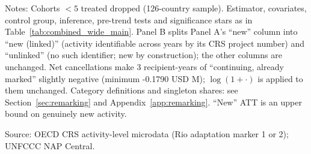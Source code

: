 \begin{table}[H]
{\begin{tabular}{lcccc}
\bottomrule
\end{tabular}
}
\endgroup
\par\vspace{4pt}
\begin{minipage}{\linewidth}\footnotesize
Notes: Cohorts $<5$ treated dropped (126-country sample). Estimator, covariates, control group, inference, pre-trend tests and significance stars as in Table~\ref{tab:combined_wide_main}. Panel B splits Panel A's ``new'' column into ``new (linked)'' (activity identifiable across years by its CRS project number) and ``unlinked'' (no such identifier; new by construction); the other columns are unchanged. Net cancellations make 3 recipient-years of ``continuing, already marked'' slightly negative (minimum -0.1790 USD M); $\log(1+\cdot)$ is applied to them unchanged. Category definitions and singleton shares: see Section~\ref{sec:remarking} and Appendix~\ref{app:remarking}. ``New'' ATT is an upper bound on genuinely new activity.\par
Source: OECD CRS activity-level microdata (Rio adaptation marker 1 or 2); UNFCCC NAP Central.
\end{minipage}
\end{table}
